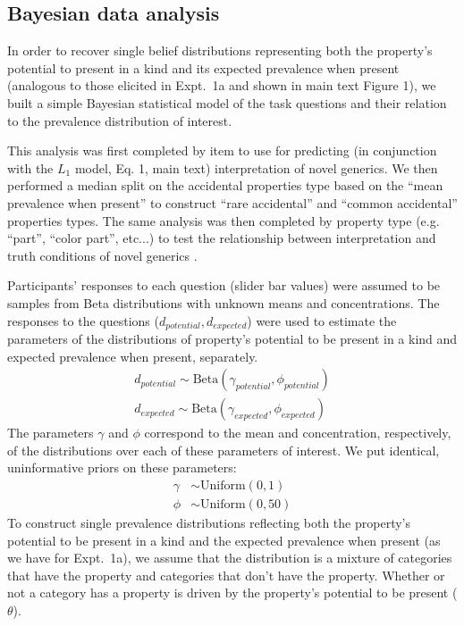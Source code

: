 \documentclass[10pt,letterpaper]{article}
\begin{document}
\subsection{Bayesian data analysis}
\label{sec:bda2}

In order to recover single belief distributions representing both the property's potential to present in a kind and its expected prevalence when present (analogous to those elicited in Expt.~1a and shown in main text Figure 1), we built a simple Bayesian statistical model of the task questions and their relation to the prevalence distribution of interest. 

This analysis was first completed by item to use for predicting (in conjunction with the $L_1$ model, Eq. 1, main text) interpretation of novel generics.
We then performed a median split on the accidental properties type based on the ``mean prevalence when present'' to construct ``rare accidental'' and ``common accidental'' properties types. 
The same analysis was then completed by property type (e.g. ``part'', ``color part'', etc...) to test the relationship between interpretation and truth conditions of novel generics \cite{Cimpian2010}.

Participants' responses to each question (slider bar values) were assumed to be samples from Beta distributions with unknown means and concentrations. 
The responses to the questions ($d_{potential}, d_{expected}$) were used to estimate the parameters of the distributions of property's potential to be present in a kind and expected prevalence when present, separately. 
\begin{align*}
d_{potential} \sim \text{Beta}(\gamma_{potential}, \phi_{potential}) \\
d_{expected} \sim \text{Beta}(\gamma_{expected}, \phi_{expected}) 
\end{align*}
The parameters $\gamma$ and $\phi$ correspond to the mean and concentration, respectively, of the distributions over each of these parameters of interest.
We put identical, uninformative priors on these parameters:
\begin{align*}
\gamma & \sim \text{Uniform}(0,1) \\
\phi & \sim \text{Uniform}(0,50) 
\end{align*}
To construct single prevalence distributions reflecting both the property's potential to be present in a kind and the expected prevalence when present (as we have for Expt.~1a), we assume that the distribution is a mixture of categories that have the property and categories that don't have the property.
Whether or not a category has a property is driven by the property's potential to be present ($\theta$).
%
\end{document}
